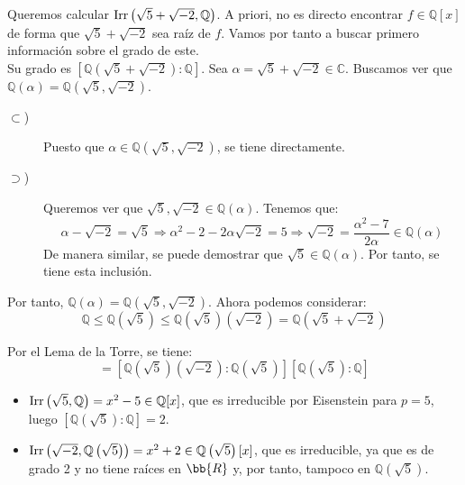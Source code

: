 \begin{ejemplo}
    Queremos calcular $\operatorname{Irr}\left(\sqrt{5}+\sqrt{-2}, \mathbb{Q}\right)$. A priori, no es directo encontrar $f\in \mathbb{Q}[x]$ de forma que $\sqrt{5}+\sqrt{-2}$ sea raíz de $f$. Vamos por tanto a buscar primero información sobre el grado de este.\\

    \noindent
    Su grado es $\left[\mathbb{Q}(\sqrt{5}+\sqrt{-2}):\mathbb{Q}\right]$. Sea $\alpha = \sqrt{5}+\sqrt{-2}\in \mathbb{C}$. Buscamos ver que $\mathbb{Q}(\alpha) = \mathbb{Q}\left(\sqrt{5},\sqrt{-2}\right)$.
    \begin{description}
        \item[$\subset$)] Puesto que $\alpha\in \mathbb{Q}\left(\sqrt{5},\sqrt{-2}\right)$, se tiene directamente.
        \item[$\supset$)] Queremos ver que $\sqrt{5},\sqrt{-2}\in \mathbb{Q}(\alpha)$. Tenemos que:
        \begin{equation*}
            \alpha-\sqrt{-2} = \sqrt{5} \Longrightarrow \alpha^2 -2 -2\alpha\sqrt{-2} = 5\Longrightarrow 
            \sqrt{-2} = \dfrac{\alpha^2-7}{2\alpha} \in  \mathbb{Q}(\alpha)
        \end{equation*}
        De manera similar, se puede demostrar que $\sqrt{5} \in \mathbb{Q}(\alpha)$. Por tanto, se tiene esta inclusión.
    \end{description}
    
    Por tanto, $\mathbb{Q}(\alpha) = \mathbb{Q}\left(\sqrt{5},\sqrt{-2}\right)$. Ahora podemos considerar:
    \begin{equation*}
        \mathbb{Q} \leq \mathbb{Q}\left(\sqrt{5}\right) \leq \mathbb{Q}\left(\sqrt{5}\right)\left(\sqrt{-2}\right) = \mathbb{Q}\left(\sqrt{5}+\sqrt{-2}\right)
    \end{equation*}
    
    Por el Lema de la Torre, se tiene:
    \begin{equation*}
        [\mathbb{Q}(\sqrt{5}+\sqrt{-2}):\mathbb{Q}] = \left[\mathbb{Q}\left(\sqrt{5}\right)\left(\sqrt{-2}\right):\mathbb{Q}\left(\sqrt{5}\right)\right]\left[\mathbb{Q}\left(\sqrt{5}\right):\mathbb{Q}\right] 
    \end{equation*}
    \begin{itemize}
        \item $\operatorname{Irr}\left(\sqrt{5},\mathbb{Q}\right) = x^2-5 \in \mathbb{Q}[x]$, que es irreducible por Eisenstein para $p=5$, luego $\left[\mathbb{Q}\left(\sqrt{5}\right):\mathbb{Q}\right] = 2$.
        \item $\operatorname{Irr}\left(\sqrt{-2},\mathbb{Q}\left(\sqrt{5}\right)\right) = x^2+2 \in \mathbb{Q}\left(\sqrt{5}\right)[x]$, que es irreducible, ya que es de grado 2 y no tiene raíces en $\bb{R}$ y, por tanto, tampoco en $\mathbb{Q}(\sqrt{5})$.
    \end{itemize}
    

\end{ejemplo}
